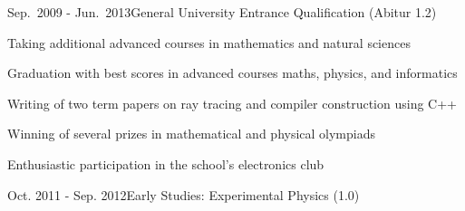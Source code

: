 \documentclass[a4paper,10pt]{cv}
\begin{document}
  \cvHead
      \begin{cvTimeItem}{Sep.~2009 - Jun.~2013}{General University Entrance Qualification (Abitur 1.2)}
        \begin{cvItemize}
          \item Taking additional advanced courses in mathematics and natural sciences
          \item Graduation with best scores in advanced courses maths, physics, and informatics
          \item Writing of two term papers on ray tracing and compiler construction using C++
          \item Winning of several prizes in mathematical and physical olympiads
          \item Enthusiastic participation in the school's electronics club
        \end{cvItemize}
      \end{cvTimeItem}

      \begin{cvTimeItem}{Oct. 2011 - Sep. 2012}{Early Studies: Experimental Physics (1.0)}
      \end{cvTimeItem}
\end{document}
